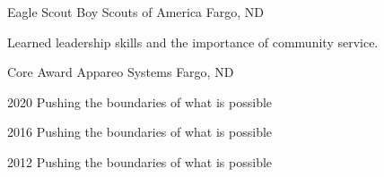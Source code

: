 \begin{cventries}
  \cventry
    {Eagle Scout} %
    {Boy Scouts of America} %
    {Fargo, ND} %
    {} %
    {
      \begin{cvitems} %
        \item {Learned leadership skills and the importance of community service.}
      \end{cvitems}
    }

  \cventry
    {Core Award} %
    {Appareo Systems} %
    {Fargo, ND} %
    {} %
    {
      \begin{cvitems} %
        \item {2020 Pushing the boundaries of what is possible}
        \item {2016 Pushing the boundaries of what is possible}
        \item {2012 Pushing the boundaries of what is possible}
      \end{cvitems}
    }

\end{cventries}
